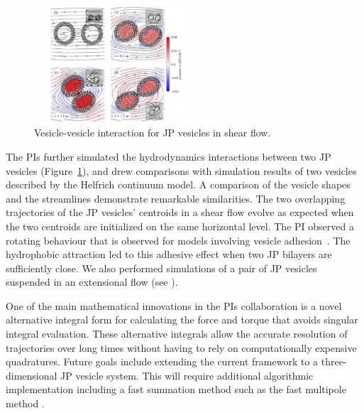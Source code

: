 \begin{figure}
\includegraphics[width=0.5\textwidth]{figures/ShearDoublet.jpg}
\caption{\label{fig:JPv_interactions} Vesicle-vesicle interaction for JP
  vesicles in shear flow.}
\end{figure}
The PIs further simulated the hydrodynamics interactions between two JP
vesicles (Figure~\ref{fig:JPv_interactions}), and drew comparisons with
simulation results of two vesicles described by the Helfrich continuum
model. A comparison of the vesicle shapes and the streamlines
demonstrate remarkable similarities. The two overlapping trajectories of
the JP vesicles' centroids in a shear flow evolve as expected when the
two centroids are initialized on the same horizontal level. The PI
observed a rotating behaviour that is observed for models involving
vesicle adhesion~\cite{qua-vee-you2019, abb-far-ezz-ben-mis2021}. The
hydrophobic attraction led to this adhesive effect when two JP bilayers
are sufficiently close. We also performed simulations of a pair
of JP vesicles suspended in an extensional flow (see \cite{FuQuRyYo22}).

One of the main mathematical innovations in the PIs collaboration is a
novel alternative integral form for calculating the force and torque
that avoids singular integral evaluation. These alternative integrals
allow the accurate resolution of trajectories over long times without
having to rely on computationally expensive quadratures. Future goals
include extending the current framework to a three-dimensional JP
vesicle system. This will require additional algorithmic implementation
including a fast summation method such as the fast multipole method \cite{Yan2019}.



